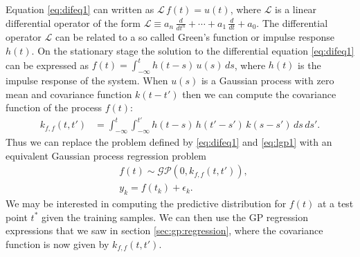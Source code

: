 \documentclass[journal]{IEEEtran}
\newcommand{\simo}[1]{{\color{red}#1}}
\begin{document}
Equation \eqref{eq:difeq1} can written as $\mathcal{L} \, f(t)=u(t)$, where $\mathcal{L}$ is a linear
differential operator of the form $\mathcal{L}\equiv a_n \, \frac{d}{dt^{n}} + \cdots
  + a_1 \, \frac{d}{dt} + a_0$. The differential operator $\mathcal{L}$ can be related to a so called Green's function or
impulse response $h(t)$.
On the stationary stage the solution to the differential equation \eqref{eq:difeq1} can be expressed as $f(t) = \int_{-\infty}^{t} h(t - s) \, u(s) \, ds$, where $h(t)$ is the impulse response of the system. When $u(s)$ is a Gaussian process with zero mean and covariance function $k(t - t')$ then we can compute the covariance function of the process $f(t)$:
%
\begin{equation}
\begin{split}
  k_{f,f}(t, t') &=
  \int_{-\infty}^{t} \int_{-\infty}^{t'}
  h(t - s) \, h(t' - s') \, k(s - s') \, ds \, ds'.
\end{split}
\label{eq:fcov}
\end{equation}
%
Thus we can replace the problem defined by \eqref{eq:difeq1} and \eqref{eq:lgp1} with an equivalent Gaussian process regression problem
%
\begin{eqnarray}
  &f(t) \sim \mathcal{GP}(0,k_{f, f}(t, t')), \label{eq:lgp2} \\
  &y_k = f(t_k) + \epsilon_k. \label{eq:meas2}
\end{eqnarray}
%
We may be interested in computing the predictive distribution for $f(t)$ at a test point $t^*$ given the training samples.
We can then use the GP regression expressions that we saw in section \ref{sec:gp:regression}, where the covariance
function is now given by $k_{f,f}(t,t')$.
\end{document}
